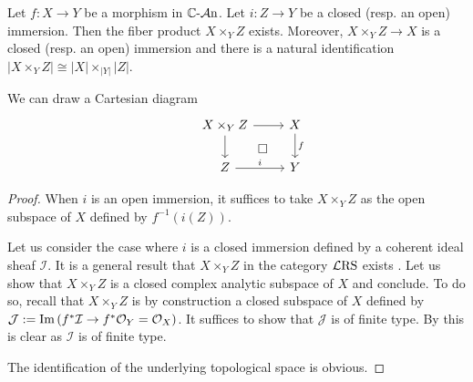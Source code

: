\begin{lemma}\label{lma-existfiberproductimmersion}
    Let $f:X\rightarrow Y$ be a morphism in $\mathbb{C}\text{-}\mathcal{A}\mathrm{n}$. Let $i:Z\rightarrow Y$ be a closed (resp. an open) immersion. Then the fiber product $X\times_Y Z$ exists. Moreover, $X\times_Y Z\rightarrow X$ is a closed (resp. an open) immersion and there is a natural identification $|X\times_Y Z|\cong |X|\times_{|Y|}|Z|$.
\end{lemma}
We can draw a Cartesian diagram
\[
    \begin{tikzcd}
        & X\times_Y Z \arrow[r]\arrow[d]\arrow[rd,"\square",phantom] & X \arrow[d,"f"]\\
        & Z  \arrow[r,"i"] & Y
    \end{tikzcd}
\]
\begin{proof}
    When $i$ is an open immersion, it suffices to take $X\times_Y Z$ as the open subspace of $X$ defined by $f^{-1}(i(Z))$.

    Let us consider the case where $i$ is a closed immersion defined by a coherent ideal sheaf $\mathcal{I}$. It is a general result that $X\times_Y Z$ in the category $\mathcal{L}\mathrm{RS}$ exists \cite[\href{https://stacks.math.columbia.edu/tag/01HQ}{Tag 01HQ}]{stacks-project}. Let us show that $X\times_Y Z$ is a closed complex analytic subspace of $X$ and conclude. To do so, recall that $X\times_Y Z$ is by construction a closed subspace of $X$ defined by $\mathcal{J}:=\operatorname{Im} \left(f^*\mathcal{I}\rightarrow f^*\mathcal{O}_Y=\mathcal{O}_X\right)$. It suffices to show that $\mathcal{J}$ is of finite type. By this is clear as $\mathcal{I}$ is of finite type.

    The identification of the underlying topological space is obvious.
\end{proof}

